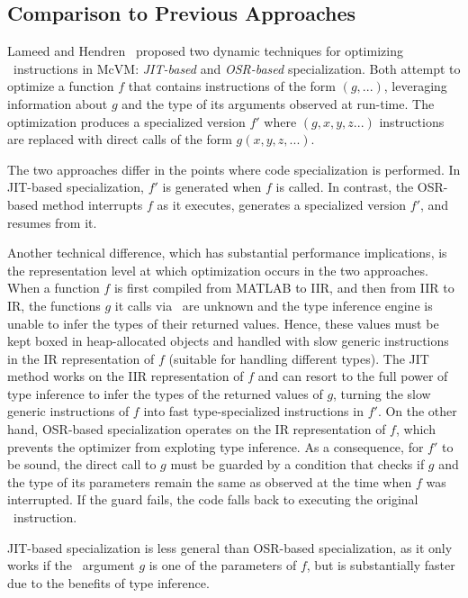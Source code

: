 
\subsection{Comparison to Previous Approaches}
\label{ss:prev-eval-sol}

Lameed and Hendren~\cite{lameed2013feval} proposed two dynamic techniques for optimizing \feval\ instructions in McVM: {\em JIT-based} and {\em OSR-based} specialization. Both attempt to optimize a function $f$ that contains instructions of the form \feval$(g,...)$, leveraging information about $g$ and the type of its arguments observed at run-time. The optimization produces a specialized version $f'$ where \feval$(g,x,y,z...)$ instructions are replaced with direct calls of the form $g(x,y,z,...)$. 

The two approaches differ in the points where code specialization is performed. In JIT-based specialization, $f'$ is generated when $f$ is called. In contrast, the OSR-based method interrupts $f$ as it executes, generates a specialized version $f'$, and resumes from it.  

Another technical difference, which has substantial performance implications, is the representation level at which optimization occurs in the two approaches. When a function $f$ is first compiled from MATLAB to IIR, and then from IIR to IR, the functions $g$ it calls via \feval\ are unknown and the type inference engine is unable to infer the types of their returned values. Hence, these values must be kept boxed in heap-allocated objects and handled with slow generic instructions in the IR representation of $f$ (suitable for handling different types). The JIT method works on the IIR representation of $f$ and can resort to the full power of type inference to infer the types of the returned values of $g$, turning the slow generic instructions of $f$ into fast type-specialized instructions in $f'$. On the other hand, OSR-based specialization operates on the IR representation of $f$, which prevents the optimizer from exploting type inference. As a consequence, for $f'$ to be sound, the direct call to $g$ must be guarded by a condition that checks if $g$ and the type of its parameters remain the same as observed at the time when $f$ was interrupted. If the guard fails, the code falls back to executing the original \feval\ instruction. 

JIT-based specialization is less general than OSR-based specialization, as it only works if the \feval\ argument $g$ is one of the parameters of $f$, but is substantially faster due to the benefits of type inference.

